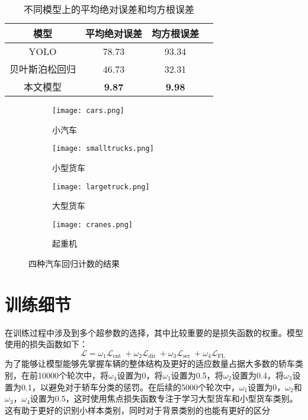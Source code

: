 \begin{table}[h]
  \centering
  \caption{不同模型上的平均绝对误差和均方根误差}
  \label{tab:MSEtest}
  \begin{tabularx}{\textwidth}{CCCC}
    \toprule
    模型  & 平均绝对误差 & 均方根误差  \\
    \midrule
    YOLO      & 78.73 & 93.34 \\ 
    贝叶斯泊松回归  & 46.73 & 32.31 \\
    本文模型      & \textbf{9.87} & \textbf{9.98} \\ 
    \bottomrule
  \end{tabularx}
\end{table}  
\begin{figure}[h]
  \centering
  \begin{subfigure}{0.45\textwidth}
    \texttt{[image: cars.png]}
    \caption{小汽车}
    \label{fig:subfig-a}
  \end{subfigure}\quad %
  \begin{subfigure}{0.45\textwidth}
    \texttt{[image: smalltrucks.png]}
    \caption{小型货车}
    \label{fig:subfig-b}
  \end{subfigure}

  \begin{subfigure}{0.45\textwidth}
    \texttt{[image: largetruck.png]}
    \caption{大型货车}
    \label{fig:subfig-c}
  \end{subfigure}\quad %
  \begin{subfigure}{0.45\textwidth}
    \texttt{[image: cranes.png]}
    \caption{起重机}
    \label{fig:subfig-d}
  \end{subfigure}

  \caption{四种汽车回归计数的结果}
  \label{fig:multi-image}
\end{figure}

\section{训练细节}
在训练过程中涉及到多个超参数的选择，其中比较重要的是损失函数的权重。模型使用的损失函数如下：
\begin{equation}
    \mathcal{L}=\omega_1\mathcal{L}_{\text {ent }}+\omega_2\mathcal{L}_{\text {dir }}+\omega_3\mathcal{L}_{\text {ser }}
    +\omega_4\mathcal{L}_{\text {FL }}
\end{equation}
为了能够让模型能够先掌握车辆的整体结构及更好的适应数量占据大多数的轿车类别，在前10000个轮次中，将\(\omega_4\)设置为0，将\(\omega_1\)设置为0.5，将\(\omega_2\)设置为0.4，将\(\omega_3\)设置为0.1，以避免对于轿车分类的惩罚。在后续的5000个轮次中，\(\omega_1\)设置为0，\(\omega_2\)和\(\omega_3\)，\(\omega_4\)设置为0.5，这时使用焦点损失函数专注于学习大型货车和小型货车类别。这有助于更好的识别小样本类别，同时对于背景类别的也能有更好的区分


